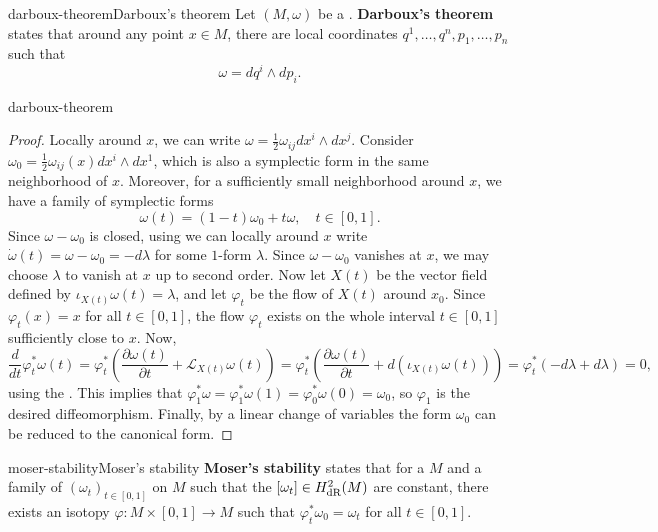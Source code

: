 \begin{topic}{darboux-theorem}{Darboux's theorem}
    Let $(M, \omega)$ be a . \textbf{Darboux's theorem} states that around any point $x \in M$, there are local coordinates $q^1, \ldots, q^n, p_1, \ldots, p_n$ such that
    \[ \omega = dq^i \wedge dp_i . \]
\end{topic}

\begin{example}{darboux-theorem}
    \begin{proof}
        Locally around $x$, we can write $\omega = \frac{1}{2} \omega_{ij} dx^i \wedge dx^j$. Consider $\omega_0 = \frac{1}{2} \omega_{ij}(x) dx^i \wedge dx^1$, which is also a symplectic form in the same neighborhood of $x$. Moreover, for a sufficiently small neighborhood around $x$, we have a family of symplectic forms
        \[ \omega(t) = (1 - t) \omega_0 + t \omega , \quad t \in [0, 1] . \]
        Since $\omega - \omega_0$ is closed, using  we can locally around $x$ write $\dot{\omega}(t) = \omega - \omega_0 = - d \lambda$ for some $1$-form $\lambda$. Since $\omega - \omega_0$ vanishes at $x$, we may choose $\lambda$ to vanish at $x$ up to second order. Now let $X(t)$ be the vector field defined by $\iota_{X(t)} \omega(t) = \lambda$, and let $\varphi_t$ be the flow of $X(t)$ around $x_0$. Since $\varphi_t(x) = x$ for all $t \in [0, 1]$, the flow $\varphi_t$ exists on the whole interval $t \in [0, 1]$ sufficiently close to $x$. Now,
        \[ \frac{d}{dt} \varphi_t^* \omega(t) = \varphi_t^* \left(\frac{\partial \omega(t)}{\partial t} + \mathcal{L}_{X(t)} \omega(t) \right) = \varphi_t^* \left(\frac{\partial \omega(t)}{\partial t} + d(\iota_{X(t)} \omega(t)) \right) = \varphi_t^* \left( -d \lambda + d \lambda \right) = 0 , \]
        using the . This implies that $\varphi_1^* \omega = \varphi_1^* \omega(1) = \varphi_0^* \omega(0) = \omega_0$, so $\varphi_1$ is the desired diffeomorphism. Finally, by a linear change of variables the form $\omega_0$ can be reduced to the canonical form.
    \end{proof}
\end{example}

\begin{topic}{moser-stability}{Moser's stability}
    \textbf{Moser's stability} states that for a   $M$ and a family of  $(\omega_t)_{t \in [0, 1]}$ on $M$ such that the  $[\omega_t] \in H^2_{\textup{dR}}(M)$ are constant, there exists an isotopy $\varphi \colon M \times [0, 1] \to M$ such that $\varphi_t^* \omega_0 = \omega_t$ for all $t \in [0, 1]$.
\end{topic}

